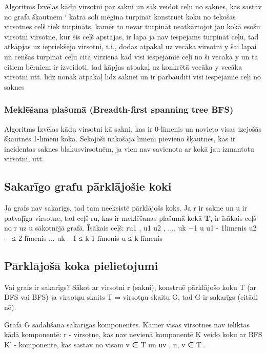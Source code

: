 \documentclass{article}
\begin{document}
Algoritms
Izvēlas kādu virsotni par sakni un sāk veidot ceļu no saknes, kas sastāv no grafa šķautnēm ‘
katrā solī mēgina turpināt konstruēt koku no tekošās virsotnes
ceļš tiek turpināts, kamēr to nevar turpināt neatkārtojot jau kokā esošu virsotni
virsotne, kur šis ceļš apstājas, ir lapa
ja nav iespējams turpināt ceļu, tad atkāpjas uz iepriekšējo virsotni, t.i., dodas atpakaļ uz vecāka virsotni y šai lapai un cenšas turpināt ceļu citā virzienā
kad visi iespējamie ceļi no šī vecāka y un tā citiem bērniem ir izveidoti, tad kāpjas atpakaļ uz konkrētā vecāka y vecāka virsotni utt. līdz nonāk atpakaļ līdz saknei un ir pārbaudīti visi iespējamie ceļi no saknes

\subsubsection{Meklēšana plašumā (Breadth-first spanning tree BFS)}

Algoritms
Izvēlas kādu virsotni kā sakni, kas ir 0-līmenis un novieto visas izejošās šķautnes 1-līmenī kokā. Sekojoši nākošajā līmenī pievieno šķautnes, kas ir incidentas saknes blakusvirsotnēm, ja vien nav savienota ar kokā jau izmantotu virsotni, utt.

\subsection{Sakarīgo grafu pārklājošie koki}

Ja grafs nav sakarīgs, tad tam neeksistē pārklājošs koks.  Ja r ir sakne un u ir patvaļīga virsotne, tad ceļš ru, kas ir meklēšanas
plašumā kokā \textbf{T, }ir īsākais ceļš no r uz u sākotnējā grafā.
Īsākais ceļš: ru1 , u1 u2 , ..., uk −1 u
u1 - 1līmenis
u2 − ≤ 2 līmenis
...
uk −1 ≤ k-1 līmenis
u ≤ k līmenis


\subsection{Pārklājošā koka pielietojumi}

Vai grafs ir sakarīgs? Sākot ar virsotni r (sakni), konstruē pārklājošo koku T (ar DFS vai BFS) ja virsotņu skaits T = virsotņu skaitu G, tad G ir sakarīgs (citādi nē).

Grafa G sadalīšana sakarīgās komponentēs. Kamēr visas virsotnes nav ieliktas kādā komponentē: r - virsotne, kas nav nevienā komponentē K veido koku ar BFS K' - komponente, kas sastāv no visām v ∈ T un uv , u, v ∈ T .
\end{document}
